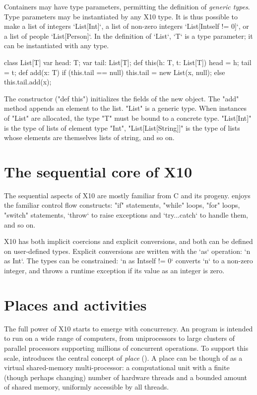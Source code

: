 Containers may have type parameters, permitting the definition of
{\em generic types}.  Type parameters may be instantiated by any X10 type.  It
is thus possible to make a list of integers \xcd`List[Int]`, a list of
non-zero integers \xcd`List[Int{self != 0}]`, or a list of people
\xcd`List[Person]`.  In the definition of \xcd`List`, \xcd`T` is a type
parameter; it can be instantiated with any type.
\begin{xten}
class List[T] {
    var head: T;
    var tail: List[T];
    def this(h: T, t: List[T]) { head = h; tail = t; }
    def add(x: T) {
        if (this.tail == null)
            this.tail = new List(x, null);
        else
            this.tail.add(x);
    }
}
\end{xten}
The constructor (\xcd"def this") initializes the fields of the new object.
The \xcd"add" method appends an element to the list.
\xcd"List" is a generic type.  When  instances of \xcd"List" are
allocated, the type \param{} \xcd"T" must be bound to a concrete
type.  \xcd"List[Int]" is the type of lists of element type
\xcd"Int", \xcd"List[List[String]]" is the type of lists whose elements are
themselves lists of string, and so on.


\section{The sequential core of X10}

The sequential aspects of X10 are mostly familiar from C and its progeny.
\Xten{} enjoys the familiar control flow constructs: \xcd"if" statements,
\xcd"while" loops, \xcd"for" loops, \xcd"switch" statements, \xcd`throw` to
raise exceptions and \xcd`try...catch` to handle them, and so on.

X10 has both implicit coercions and explicit conversions, and both can be
defined on user-defined types.  Explicit conversions are written with the
\xcd`as` operation: \xcd`n as Int`.  The types can be constrained: 
\xcd`n as Int{self != 0}` converts \xcd`n` to a non-zero integer, and throws a
runtime exception if its value as an integer is zero.

\section{Places and activities}

The full power of X10 starts to emerge with concurrency.
An \Xten{} program is intended to run on a wide range of computers,
from uniprocessors to large clusters of parallel processors supporting
millions of concurrent operations. To support this scale, \Xten{}
introduces the central concept of \emph{place} ().
A place can be though of as a virtual shared-memory multi-processor:
a computational unit with a finite (though perhaps changing) number of
hardware threads and a bounded amount of shared memory, uniformly
accessible by all threads.



